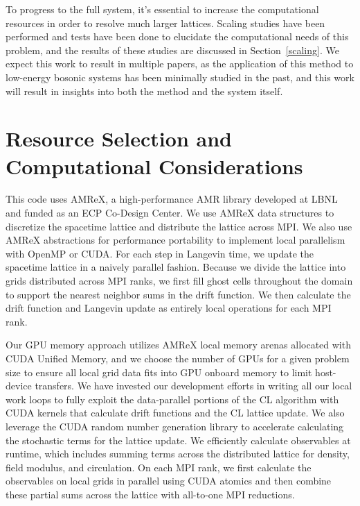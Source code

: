 \documentclass[onecolumn, 12pt]{article}
\begin{document}
To progress to the full system, it's essential to increase the computational resources in order to resolve much larger lattices. Scaling studies have been performed and tests have been done to elucidate the computational needs of this problem, and the results of these studies are discussed in Section~\ref{scaling}. We expect this work to result in multiple papers, as the application of this method to low-energy bosonic systems has been minimally studied in the past, and this work will result in insights into both the method and the system itself.

\section{Resource Selection and Computational Considerations}
This code uses AMReX, a high-performance AMR library developed at LBNL and funded as an ECP Co-Design Center. We use AMReX data structures to discretize the spacetime lattice and distribute the lattice across MPI. We also use AMReX abstractions for performance portability to implement local parallelism with OpenMP or CUDA.
For each step in Langevin time, we update the spacetime lattice in a naively parallel fashion.
Because we divide the lattice into grids distributed across MPI ranks, we first fill ghost cells throughout the domain to support the nearest neighbor sums in the drift function.
We then calculate the drift function and Langevin update as entirely local operations for each MPI rank.

Our GPU memory approach utilizes AMReX local memory arenas allocated with CUDA Unified Memory, and we choose the number of GPUs for a given problem size to ensure all local grid data fits into GPU onboard memory to limit host-device transfers.
We have invested our development efforts in writing all our local work loops to fully exploit the data-parallel portions of the CL algorithm with CUDA kernels that calculate drift functions and the CL lattice update. We also leverage the CUDA random number generation library to accelerate calculating the stochastic terms for the lattice update.
We efficiently calculate observables at runtime, which includes summing terms across the distributed lattice for density, field modulus, and circulation. On each MPI rank, we first calculate the observables on local grids in parallel using CUDA atomics and then combine these partial sums across the lattice with all-to-one MPI reductions.
\end{document}

